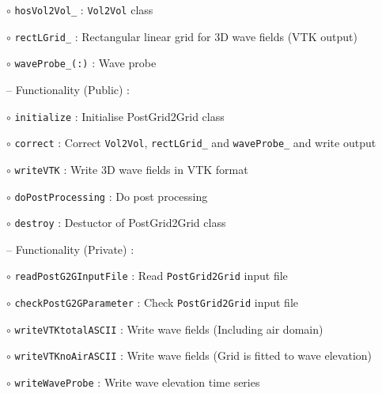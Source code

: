 	\hspace{1.0 cm} $\circ$ \texttt{hosVol2Vol\_} : \texttt{Vol2Vol} class
	
	\hspace{1.0 cm} $\circ$ \texttt{rectLGrid\_} : Rectangular linear grid for 3D wave fields (VTK output)
	
	\hspace{1.0 cm} $\circ$ \texttt{waveProbe\_(:)} : Wave probe 
	
	\vspace{0.5cm}
	
	\hspace{0.5 cm} -- Functionality (Public) :
	
	\hspace{1.0 cm} $\circ$ \texttt{initialize} : Initialise PostGrid2Grid class
	
	\hspace{1.0 cm} $\circ$ \texttt{correct} : Correct \texttt{Vol2Vol}, \texttt{rectLGrid\_} and \texttt{waveProbe\_} and write output
	
	\hspace{1.0 cm} $\circ$ \texttt{writeVTK} : Write 3D wave fields in VTK format
	
	\hspace{1.0 cm} $\circ$ \texttt{doPostProcessing} : Do post processing 
	
	\hspace{1.0 cm} $\circ$ \texttt{destroy} : Destuctor of PostGrid2Grid class
	
	\vspace{0.5cm}
	
	\hspace{0.5 cm} -- Functionality (Private) :
	
	\hspace{1.0 cm} $\circ$ \texttt{readPostG2GInputFile} : Read \texttt{PostGrid2Grid} input file
	
	\hspace{1.0 cm} $\circ$ \texttt{checkPostG2GParameter} : Check \texttt{PostGrid2Grid} input file
	
	\hspace{1.0 cm} $\circ$ \texttt{writeVTKtotalASCII} : Write wave fields (Including air domain)
	
	\hspace{1.0 cm} $\circ$ \texttt{writeVTKnoAirASCII} : Write wave fields (Grid is fitted to wave elevation)
	
	\hspace{1.0 cm} $\circ$ \texttt{writeWaveProbe} : Write wave elevation time series
	
